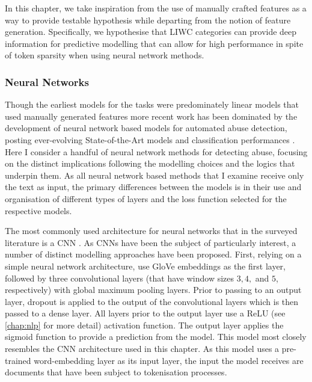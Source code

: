 \vspace{5mm}

In this chapter, we take inspiration from the use of manually crafted features as a way to provide testable hypothesis while departing from the notion of feature generation.
Specifically, we hypothesise that LIWC categories can provide deep information for predictive modelling that can allow for high performance in spite of token sparsity when using neural network methods.

\subsubsection{Neural Networks}\label{sec:liwc_nn}
Though the earliest models for the tasks were predominately linear models that used manually generated features \citep{Waseem-Hovy:2016,Davidson:2017,Warner:2012} more recent work has been dominated by the development of neural network based models for automated abuse detection, posting ever-evolving State-of-the-Art models and classification performances \citep[e.g.]{Park:2017,Badjatiya:2017,Zimmerman:2018,Stoop:2019,Isaksen:2020}.
Here I consider a handful of neural network methods for detecting abuse, focusing on the distinct implications following the modelling choices and the logics that underpin them.
As all neural network based methods that I examine receive only the text as input, the primary differences between the models is in their use and organisation of different types of layers and the loss function selected for the respective models.

The most commonly used architecture for neural networks that in the surveyed literature is a CNN \citep{Park:2017,Gamback:2017,Wulczyn:2017,Kolhatkar:2020,Zimmerman:2018,Wang:2020}.
As CNNs have been the subject of particularly interest, a number of distinct modelling approaches have been proposed.
First, relying on a simple neural network architecture, \citet{Kolhatkar:2020} use GloVe embeddings as the first layer, followed by three convolutional layers (that have window sizes $3, 4,$ and $5$, respectively) with global maximum pooling layers.
Prior to passing to an output layer, dropout is applied to the output of the convolutional layers which is then passed to a dense layer.
All layers prior to the output layer use a ReLU (see \cref{chap:nlp} for more detail) activation function.
The output layer applies the sigmoid function to provide a prediction from the model.
This model most closely resembles the CNN architecture used in this chapter.
As this model uses a pre-trained word-embedding layer as its input layer, the input the model receives are documents that have been subject to tokenisation processes.

